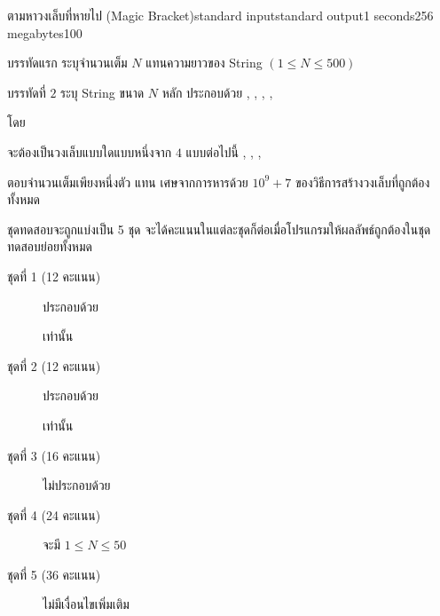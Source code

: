 \documentclass[11pt,a4paper]{article}
\newenvironment{brackett}[1]{\ttfamily}{
    \text{#} \ignorespaces
}
\begin{document}
\begin{problem}{ตามหาวงเล็บที่หายไป (Magic Bracket)}{standard input}{standard output}{1 seconds}{256 megabytes}{100}
\InputFile

บรรทัดแรก ระบุจำนวนเต็ม $N$ แทนความยาวของ String $(1 \leq N \leq 500)$

บรรทัดที่ $2$ ระบุ String ขนาด $N$ หลัก ประกอบด้วย \begin{brackett}
\text{(}, \text{)}, \text{[}, \text{]}, 
\end{brackett}\hspace{-0.55em}โดย \begin{brackett}
    \text{?}
\end{brackett}\hspace{-0.55em}จะต้องเป็นวงเล็บแบบใดแบบหนึ่งจาก $4$ แบบต่อไปนี้ \begin{brackett}
    \text{(}, \text{)}, \text{[}, \text{]}
\end{brackett}\hspace{-0.55em}

\OutputFile
ตอบจำนวนเต็มเพียงหนึ่งตัว แทน เศษจากการหารด้วย $10^9 + 7$ ของวิธีการสร้างวงเล็บที่ถูกต้องทั้งหมด

\Scoring
ชุดทดสอบจะถูกแบ่งเป็น 5 ชุด จะได้คะแนนในแต่ละชุดก็ต่อเมื่อโปรแกรมให้ผลลัพธ์ถูกต้องในชุดทดสอบย่อยทั้งหมด
\begin{description}

\item[ชุดที่ 1 (12 คะแนน)] ประกอบด้วย \begin{brackett}
    \text{(, )}
\end{brackett}\hspace{-0.55em} เท่านั้น
\item[ชุดที่ 2 (12 คะแนน)] ประกอบด้วย \begin{brackett}
    \text{[, ]}
\end{brackett}\hspace{-0.55em} เท่านั้น
\item[ชุดที่ 3 (16 คะแนน)] ไม่ประกอบด้วย \begin{brackett}
    \text{?}
\end{brackett}
\item[ชุดที่ 4 (24 คะแนน)] จะมี $ 1 \leq N \leq 50$
\item[ชุดที่ 5 (36 คะแนน)] ไม่มีเงื่อนไขเพิ่มเติม 

\end{description}

\Examples

\begin{example}
%
%
\end{example}

\end{problem}
\end{document}
